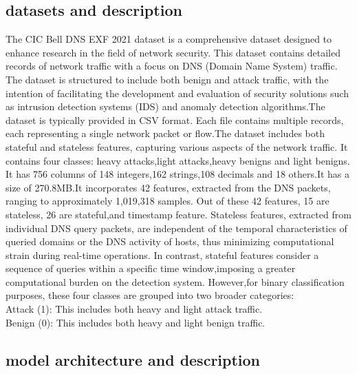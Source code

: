 \subsection{datasets and description}
The CIC Bell DNS EXF 2021 dataset \cite{CIC_Bell_DNS_EXF_2021} is a comprehensive dataset designed to enhance research in the field of network security. This dataset contains detailed records of network traffic with a focus on DNS (Domain Name System) traffic. The dataset is structured to include both benign and attack traffic, with the intention of facilitating the development and evaluation of security solutions such as intrusion detection systems (IDS) and anomaly detection algorithms.The dataset is typically provided in CSV format.
Each file contains multiple records, each representing a single network packet or flow.The dataset includes both stateful and stateless features, capturing various aspects of the network traffic. It contains four classes: heavy attacks,light attacks,heavy benigns and light benigns. It has 756 columns of 148 integers,162 strings,108 decimals and 18 others.It has a size of 270.8MB.It incorporates 42 features, extracted from the DNS packets, ranging to approximately 1,019,318 samples. Out of these 42 features, 15 are stateless, 26 are stateful,and timestamp feature. Stateless features, extracted from individual DNS query packets, are independent of the temporal characteristics of queried domains or the DNS activity of hosts, thus minimizing computational strain during real-time operations. In contrast, stateful features consider a sequence of queries within a specific time window,imposing a greater computational burden on the detection system. However,for binary classification purposes, these four classes are grouped into two broader categories:\\
Attack (1): This includes both heavy and light attack traffic.\\
Benign (0): This includes both heavy and light benign traffic.\\



\newpage
\subsection{model architecture and description}


